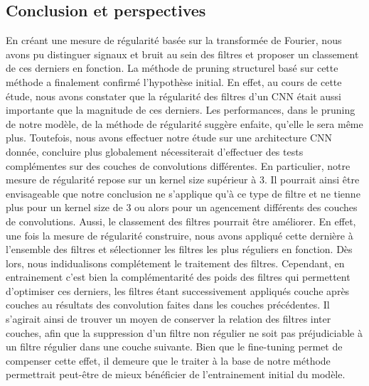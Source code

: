 \documentclass[12pt,a4paper]{article}
\begin{document}
\subsection{Conclusion et perspectives}
En créant une mesure de régularité basée sur la transformée de Fourier, nous avons pu distinguer signaux et bruit au sein des filtres et proposer un classement de ces derniers en fonction. La méthode de pruning structurel basé sur cette méthode a finalement confirmé l'hypothèse initial. 
En effet, au cours de cette étude, nous avons constater que la régularité des filtres d'un CNN était aussi importante que la magnitude de ces derniers. Les performances, dans le pruning de notre modèle, de la méthode de régularité suggère enfaite, qu'elle le sera même plus. Toutefois, nous avons effectuer notre étude sur une architecture CNN donnée, concluire plus globalement nécessiterait d'effectuer des tests complémentes sur des couches de convolutions différentes. 
En particulier, notre mesure de régularité repose sur un kernel size supérieur à 3. Il pourrait ainsi être envisageable que notre conclusion ne s'applique qu'à ce type de filtre et ne tienne plus pour un kernel size de 3 ou alors pour un agencement différents des couches de convolutions. 
Aussi, le classement des filtres pourrait être améliorer. En effet, une fois la mesure de régularité construire, nous avons appliqué cette dernière à l'ensemble des filtres et sélectionner les filtres les plus réguliers en fonction. Dès lors, nous indidualisons complétement le traitement des filtres. Cependant, en entrainement c'est bien la complémentarité des poids des filtres qui permettent d'optimiser ces derniers, les filtres étant successivement appliqués couche après couches au résultats des convolution faites dans les couches précédentes.
Il s'agirait ainsi de trouver un moyen de conserver la relation des filtres inter couches, afin que la suppression d'un filtre non régulier ne soit pas préjudiciable à un filtre régulier dans une couche suivante. Bien que le fine-tuning permet de compenser cette effet, il demeure que le traiter à la base de notre méthode permettrait peut-être de mieux bénéficier de l'entrainement initial du modèle. 
\end{document}

